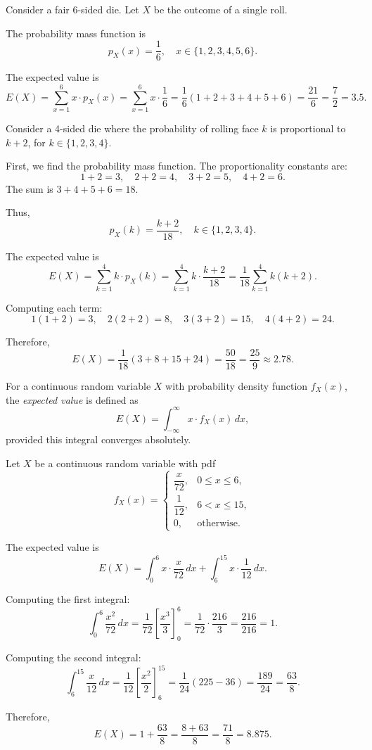 \begin{eg}
Consider a fair 6-sided die. Let \(X\) be the outcome of a single roll.

The probability mass function is
\[
p_X(x) = \frac{1}{6}, \quad x \in \{1, 2, 3, 4, 5, 6\}.
\]

The expected value is
\[
E(X) = \sum_{x=1}^{6} x \cdot p_X(x) = \sum_{x=1}^{6} x \cdot \frac{1}{6} = \frac{1}{6}(1 + 2 + 3 + 4 + 5 + 6) = \frac{21}{6} = \frac{7}{2} = 3.5.
\]
\end{eg}

\begin{eg}
Consider a 4-sided die where the probability of rolling face \(k\) is proportional to \(k + 2\), for \(k \in \{1, 2, 3, 4\}\).

First, we find the probability mass function. The proportionality constants are:
\[
1 + 2 = 3, \quad 2 + 2 = 4, \quad 3 + 2 = 5, \quad 4 + 2 = 6.
\]
The sum is \(3 + 4 + 5 + 6 = 18\).

Thus,
\[
p_X(k) = \frac{k + 2}{18}, \quad k \in \{1, 2, 3, 4\}.
\]

The expected value is
\[
E(X) = \sum_{k=1}^{4} k \cdot p_X(k) = \sum_{k=1}^{4} k \cdot \frac{k + 2}{18} = \frac{1}{18} \sum_{k=1}^{4} k(k + 2).
\]

Computing each term:
\[
1(1 + 2) = 3, \quad 2(2 + 2) = 8, \quad 3(3 + 2) = 15, \quad 4(4 + 2) = 24.
\]

Therefore,
\[
E(X) = \frac{1}{18}(3 + 8 + 15 + 24) = \frac{50}{18} = \frac{25}{9} \approx 2.78.
\]
\end{eg}

\begin{definition}
For a continuous random variable \(X\) with probability density function \(f_X(x)\), the \emph{expected value} is defined as
\[
E(X) = \int_{-\infty}^{\infty} x \cdot f_X(x) \, dx,
\]
provided this integral converges absolutely.
\end{definition}

\begin{eg}
Let \(X\) be a continuous random variable with pdf
\[
f_X(x) = \begin{cases}
\dfrac{x}{72}, & 0 \le x \le 6, \\[6pt]
\dfrac{1}{12}, & 6 < x \le 15, \\[4pt]
0, & \text{otherwise}.
\end{cases}
\]

The expected value is
\[
E(X) = \int_0^6 x \cdot \frac{x}{72} \, dx + \int_6^{15} x \cdot \frac{1}{12} \, dx.
\]

Computing the first integral:
\[
\int_0^6 \frac{x^2}{72} \, dx = \frac{1}{72} \left[ \frac{x^3}{3} \right]_0^6 = \frac{1}{72} \cdot \frac{216}{3} = \frac{216}{216} = 1.
\]

Computing the second integral:
\[
\int_6^{15} \frac{x}{12} \, dx = \frac{1}{12} \left[ \frac{x^2}{2} \right]_6^{15} = \frac{1}{24}(225 - 36) = \frac{189}{24} = \frac{63}{8}.
\]

Therefore,
\[
E(X) = 1 + \frac{63}{8} = \frac{8 + 63}{8} = \frac{71}{8} = 8.875.
\]
\end{eg}



